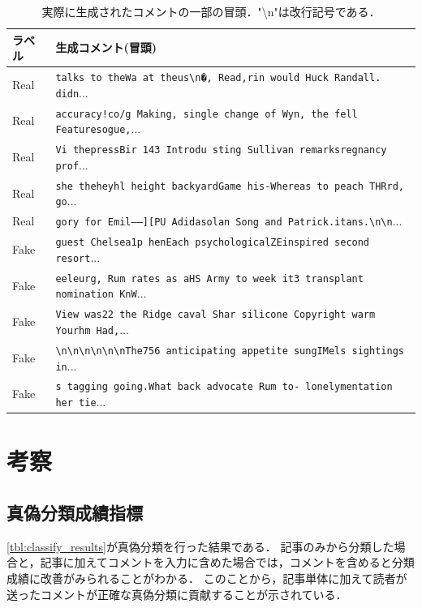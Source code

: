 \begin{landscape}
\begin{table}[p]
    \caption{実際に生成されたコメントの一部の冒頭．"\textbackslash n"は改行記号である．}
    \label{tbl:generated_comments}
    \centering
    \begin{tabular}{ll}
        \hline
        ラベル & 生成コメント(冒頭) \\ \hline
        Real & \texttt{talks to theWa at theus\textbackslash n�, Read,rin would Huck Randall. didn}...\\
        Real & \texttt{accuracy!co/g Making, single change of Wyn, the fell Featuresogue,}...\\
        Real & \texttt{Vi thepressBir 143 Introdu sting Sullivan remarksregnancy prof}...\\
        Real & \texttt{she theheyhl height backyardGame his-Whereas to peach THRrd, go}...\\
        Real & \texttt{gory for Emil-----][PU Adidasolan Song and Patrick.itans.\textbackslash n\textbackslash n}...\\ \hline
        Fake & \texttt{guest Chelsea1p henEach psychologicalZEinspired second resort}...\\
        Fake & \texttt{eeleurg, Rum rates as aHS Army to week it3 transplant nomination KnW}... \\
        Fake & \texttt{View was22 the Ridge caval Shar silicone Copyright warm Yourhm Had,}...\\
        Fake & \texttt{\textbackslash n\textbackslash n\textbackslash n\textbackslash n\textbackslash n\textbackslash nThe756 anticipating appetite sungIMels sightings in}...\\
        Fake & \texttt{s tagging going.What back advocate Rum to- lonelymentation her tie}...\\ \hline
    \end{tabular}
\end{table}
\end{landscape}

\section{考察}\label{sec:gen_evl}
\subsection{真偽分類成績指標}
\label{sec:classify_index}
\cref{tbl:classify_results}が真偽分類を行った結果である．
記事のみから分類した場合と，記事に加えてコメントを入力に含めた場合では，コメントを含めると分類成績に改善がみられることがわかる．
このことから，記事単体に加えて読者が送ったコメントが正確な真偽分類に貢献することが示されている．

